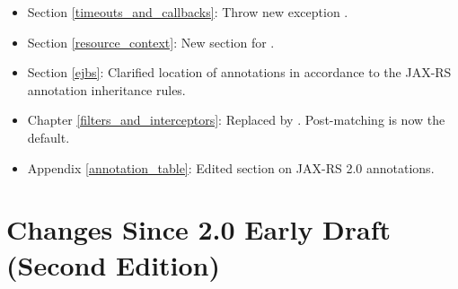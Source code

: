 \begin{itemize}
\item Section \ref{timeouts_and_callbacks}: Throw new exception .
\item Section \ref{resource_context}: New section for .
\item Section \ref{ejbs}: Clarified location of annotations in accordance to the JAX-RS annotation inheritance rules.
\item Chapter \ref{filters_and_interceptors}: Replaced  by . Post-matching is now the default.
\item Appendix \ref{annotation_table}: Edited section on JAX-RS 2.0 annotations.
\end{itemize}

\section{Changes Since 2.0 Early Draft (Second Edition)}


